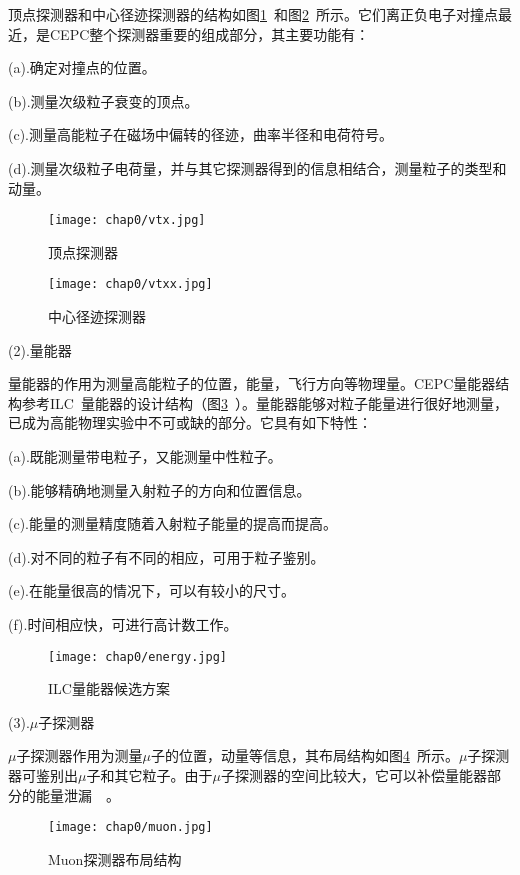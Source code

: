 顶点探测器和中心径迹探测器的结构如图\ref{fig:vtx}~和图\ref{fig:vtxx}~所示。它们离正负电子对撞点最近，是CEPC整个探测器重要的组成部分，其主要功能有：

(a).确定对撞点的位置。

(b).测量次级粒子衰变的顶点。

(c).测量高能粒子在磁场中偏转的径迹，曲率半径和电荷符号。

(d).测量次级粒子电荷量，并与其它探测器得到的信息相结合，测量粒子的类型和动量。

\begin{figure}[!htb]
  \centering
  \texttt{[image: chap0/vtx.jpg]}
  \caption{顶点探测器}
  \label{fig:vtx}
\end{figure}
\begin{figure}[!htb]
  \centering
  \texttt{[image: chap0/vtxx.jpg]}
  \caption{中心径迹探测器}
  \label{fig:vtxx}
\end{figure}
\noindent(2).量能器

量能器的作用为测量高能粒子的位置，能量，飞行方向等物理量。CEPC量能器结构参考ILC~量能器的设计结构（图\ref{fig:energy}~）。量能器能够对粒子能量进行很好地测量，已成为高能物理实验中不可或缺的部分。它具有如下特性：

(a).既能测量带电粒子，又能测量中性粒子。

(b).能够精确地测量入射粒子的方向和位置信息。

(c).能量的测量精度随着入射粒子能量的提高而提高。

(d).对不同的粒子有不同的相应，可用于粒子鉴别。

(e).在能量很高的情况下，可以有较小的尺寸。

(f).时间相应快，可进行高计数工作。

\begin{figure}[!htb]
  \centering
  \texttt{[image: chap0/energy.jpg]}
  \caption{ILC量能器候选方案}
  \label{fig:energy}
\end{figure}
\noindent(3).$\mu$子探测器

$\mu$子探测器作用为测量$\mu$子的位置，动量等信息，其布局结构如图\ref{fig:muon}~所示。$\mu$子探测器可鉴别出$\mu$子和其它粒子。由于$\mu$子探测器的空间比较大，它可以补偿量能器部分的能量泄漏~\cite{cite1:muon}~。

\begin{figure}[!htb]
  \centering
  \texttt{[image: chap0/muon.jpg]}
  \caption{Muon探测器布局结构}
  \label{fig:muon}
\end{figure}

